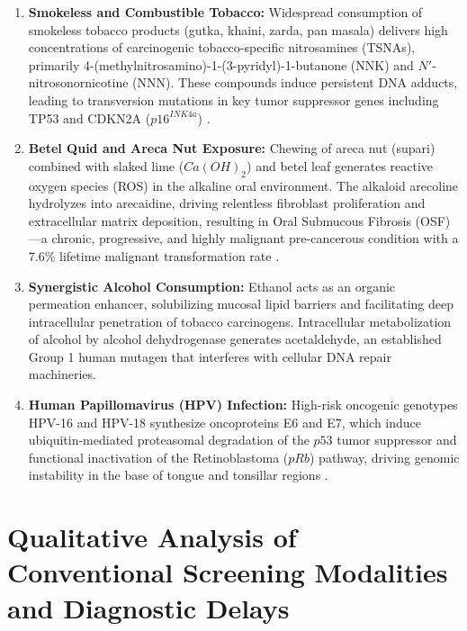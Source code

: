 \documentclass[12pt,a4paper,oneside]{report}
\begin{document}
\begin{enumerate}[label=\arabic*.]
    \item \textbf{Smokeless and Combustible Tobacco:} Widespread consumption of smokeless tobacco products (gutka, khaini, zarda, pan masala) delivers high concentrations of carcinogenic tobacco-specific nitrosamines (TSNAs), primarily 4-(methylnitrosamino)-1-(3-pyridyl)-1-butanone (NNK) and $N'$-nitrosonornicotine (NNN). These compounds induce persistent DNA adducts, leading to transversion mutations in key tumor suppressor genes including TP53 and CDKN2A ($p16^{INK4a}$) \cite{warnakulasuriya2009global}.
    
    \item \textbf{Betel Quid and Areca Nut Exposure:} Chewing of areca nut (supari) combined with slaked lime ($Ca(OH)_2$) and betel leaf generates reactive oxygen species (ROS) in the alkaline oral environment. The alkaloid arecoline hydrolyzes into arecaidine, driving relentless fibroblast proliferation and extracellular matrix deposition, resulting in Oral Submucous Fibrosis (OSF)---a chronic, progressive, and highly malignant pre-cancerous condition with a 7.6\% lifetime malignant transformation rate \cite{gupta2004epidemiology}.
    
    \item \textbf{Synergistic Alcohol Consumption:} Ethanol acts as an organic permeation enhancer, solubilizing mucosal lipid barriers and facilitating deep intracellular penetration of tobacco carcinogens. Intracellular metabolization of alcohol by alcohol dehydrogenase generates acetaldehyde, an established Group 1 human mutagen that interferes with cellular DNA repair machineries.
    
    \item \textbf{Human Papillomavirus (HPV) Infection:} High-risk oncogenic genotypes HPV-16 and HPV-18 synthesize oncoproteins E6 and E7, which induce ubiquitin-mediated proteasomal degradation of the $p53$ tumor suppressor and functional inactivation of the Retinoblastoma ($pRb$) pathway, driving genomic instability in the base of tongue and tonsillar regions \cite{johnson2020head}.
\end{enumerate}

\section{Qualitative Analysis of Conventional Screening Modalities and Diagnostic Delays}
\label{sec:conventional_screening}
\end{document}
